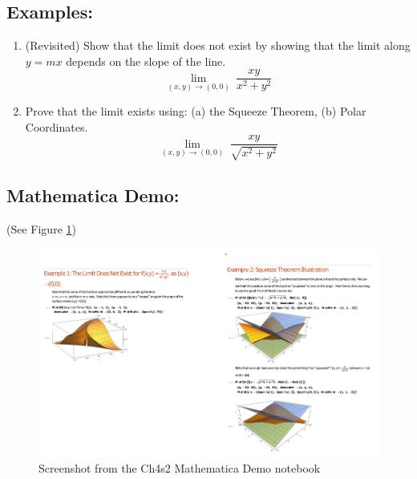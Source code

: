 


\subsection*{Examples:}

\begin{enumerate}[{Example} 1: ]
\item (Revisited) Show that the limit does not exist by showing that the limit along \(y=mx\) depends on the slope of the line.
\[\lim_{(x,y)\rightarrow (0,0)}\ \dfrac{xy}{x^2+y^2}\]


\item  Prove that the limit exists using: (a) the Squeeze Theorem, (b) Polar Coordinates.
\[\lim_{(x,y)\rightarrow (0,0)}\ \dfrac{xy}{\sqrt{x^2+y^2}}\]


\end{enumerate}

\subsection*{Mathematica Demo:}
(See Figure \ref{fig:Ch4s2demo})

\begin{figure}[!hp]
\includegraphics[]{Mathematica-Demo-Limits.png}
\caption{Screenshot from the Ch4s2 Mathematica Demo notebook}
\label{fig:Ch4s2demo}
\end{figure}



